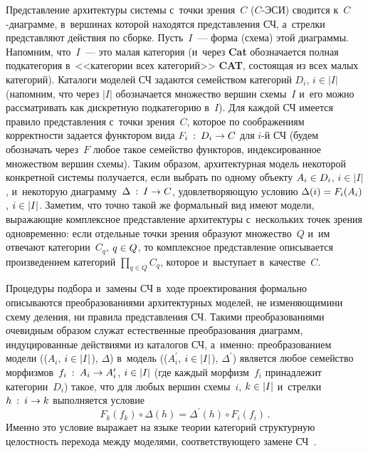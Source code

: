 \begin{multicols}{2}
Представление архитектуры системы с~точки зрения~$C$ ($C$-ЭСИ) сводится 
к~$C$-диаграмме, в~вершинах которой находятся представления СЧ, 
а~стрелки представляют действия по сборке. Пусть~$I$~--- форма (схема) этой 
диаграммы. На\-пом\-ним, что~$I$~--- это малая категория (и~через \textbf{Cat} 
обозначается полная подкатегория в~<<категории всех категорий>> 
\textbf{CAT}, состоящая из всех малых категорий). Каталоги моделей СЧ 
задаются семейством категорий $D_i$, $i \in \vert I\vert$ (напомним, что через  
$\vert I\vert$ обозначается множество вершин схемы~$I$ и~его можно 
рассматривать как дискретную подкатегорию в~$I$). Для каждой СЧ имеется 
правило пред\-став\-ле\-ния с~точки зрения~$C$, которое по соображениям 
корректности задается функтором вида $F_i \: : \: D_i\hm \to C$ для $i$-й СЧ (будем 
обозначать через~$F$ любое такое семейство функторов, индексированное 
множеством вершин схемы). Таким образом, архитектурная модель некоторой 
конкретной сис\-те\-мы получается, если выбрать по одному объекту $A_i \hm\in D_i$, 
$i \in \vert I\vert$, и~некоторую диаграмму~$\Delta \: : \: I\hm\to C$, 
удовлетворяющую условию $\Delta (i) \hm= F_i(A_i)$, $i \hm\in \vert I\vert$. Заметим, 
что точно такой же формальный вид имеют модели, выражающие комплексное 
представление архитектуры с~нескольких точек зрения одновременно: если 
отдельные точки зрения образуют множество~$Q$ и~им отвечают 
категории~$C_q$, $q\hm\in Q$, то комплексное представление описывается 
произведением категорий $\prod_{q \in Q}C_q$, которое и~выступает 
в~качестве~$C$.
{

}

Процедуры подбора и~замены СЧ в~ходе проек\-ти\-ро\-ва\-ния формально 
описываются преобразованиями архитектурных моделей, не изменяющими\linebreak ни 
схему деления, ни правила представления СЧ. Такими преобразованиями 
очевидным образом служат естественные преобразования диаграмм, 
индуцированные действиями из каталогов СЧ, а~именно: преобразованием 
модели (($A_i$, $i \hm\in \vert I\vert$), $\Delta$) в~модель (($A_i^\prime$,  
$i \hm\in \vert I\vert$), $\Delta^\prime$) является любое семейство морфизмов~$f_i \: : \: A_i \hm\to A^\prime_i$, 
$i \hm\in \vert I\vert$ (где каждый морфизм~$f_i$ принадлежит 
категории~$D_i$) такое, что для любых вершин схемы~$i$, $k \hm\in\vert I\vert$ 
и~стрелки~$h \: : \: i\hm \to k$ выполняется условие 
$$
F_k(f_k) \circ \Delta (h) = \Delta^\prime (h) \circ F_i(f_i)\,.
$$
Именно это условие выражает на языке теории категорий структурную 
целостность перехода между моделями, соответствующего замене  
СЧ~\cite{11-kov}.


\end{multicols}
